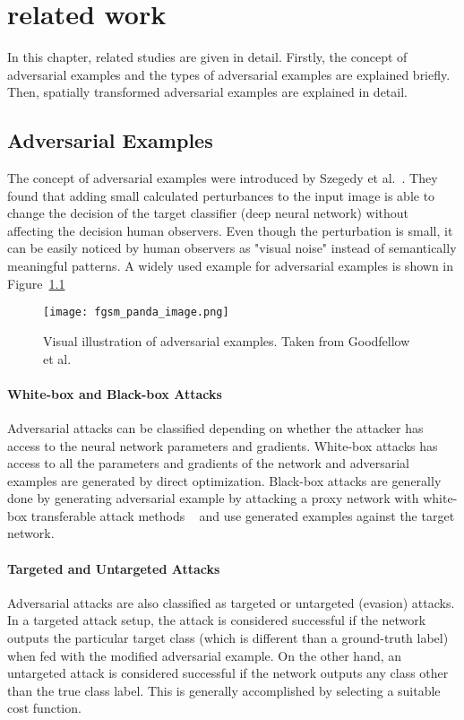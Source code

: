 \chapter{related work}
\label{chp:2_literature}

In this chapter, related studies are given in detail. Firstly, the concept of adversarial examples and the types of adversarial examples are explained briefly. Then, spatially transformed adversarial examples are explained in detail.
\section{Adversarial Examples}

The concept of adversarial examples were introduced by Szegedy et al.~\cite{szegedy2013intriguing}. They found that adding small calculated perturbances to the input image is able to change the decision of the target classifier (deep neural network) without affecting the decision human observers. Even though the perturbation is small, it can be easily noticed by human observers as "visual noise" instead of semantically meaningful patterns. A widely used example for adversarial examples is shown in Figure~\ref{fig:advexample}

\begin{figure}[h]
    \centering
    \texttt{[image: fgsm\_panda\_image.png]}
    \caption{Visual illustration of adversarial examples. Taken from Goodfellow et al.~\cite{goodfellow2014explaining}}\label{fig:advexample}
\end{figure}


\subsubsection*{White-box and Black-box Attacks}
Adversarial attacks can be classified depending on whether the attacker has access to the neural network parameters and gradients. White-box attacks has access to all the parameters and gradients of the network and adversarial examples are generated by direct optimization. Black-box attacks are generally done by generating adversarial example by attacking a proxy network with white-box transferable attack methods ~\cite{tramer2017space} and use generated examples against the target network. 

\subsubsection*{Targeted and Untargeted Attacks}
Adversarial attacks are also classified as targeted or untargeted (evasion) attacks. In a targeted attack setup, the attack is considered successful if the network outputs the particular target class (which is different than a ground-truth label) when fed with the modified adversarial example. On the other hand, an untargeted attack is considered successful if the network outputs any class other than the true class label. This is generally accomplished by selecting a suitable cost function.

